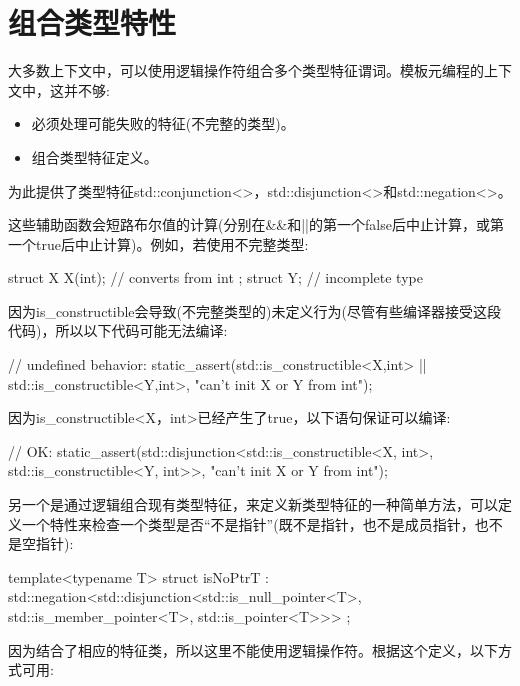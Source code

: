 \section{组合类型特性}

大多数上下文中，可以使用逻辑操作符组合多个类型特征谓词。模板元编程的上下文中，这并不够:

\begin{itemize}
\item 
必须处理可能失败的特征(不完整的类型)。

\item 
组合类型特征定义。
\end{itemize}

为此提供了类型特征std::conjunction<>，std::disjunction<>和std::negation<>。

这些辅助函数会短路布尔值的计算(分别在\&\&和||的第一个false后中止计算，或第一个true后中止计算)。例如，若使用不完整类型:

\begin{cpp}
struct X {
	X(int); // converts from int
};
struct Y; // incomplete type
\end{cpp}

因为is\_constructible会导致(不完整类型的)未定义行为(尽管有些编译器接受这段代码)，所以以下代码可能无法编译:

\begin{cpp}
// undefined behavior:
static_assert(std::is_constructible<X,int>{}
				|| std::is_constructible<Y,int>{},
			"can’t init X or Y from int");
\end{cpp}

因为is\_constructible<X，int>已经产生了true，以下语句保证可以编译:

\begin{cpp}
// OK:
static_assert(std::disjunction<std::is_constructible<X, int>,
								std::is_constructible<Y, int>>{},
			"can’t init X or Y from int");
\end{cpp}

另一个是通过逻辑组合现有类型特征，来定义新类型特征的一种简单方法，可以定义一个特性来检查一个类型是否“不是指针”(既不是指针，也不是成员指针，也不是空指针):

\begin{cpp}
template<typename T>
struct isNoPtrT : std::negation<std::disjunction<std::is_null_pointer<T>,
												std::is_member_pointer<T>,
												std::is_pointer<T>>>
{
};
\end{cpp}

因为结合了相应的特征类，所以这里不能使用逻辑操作符。根据这个定义，以下方式可用:

